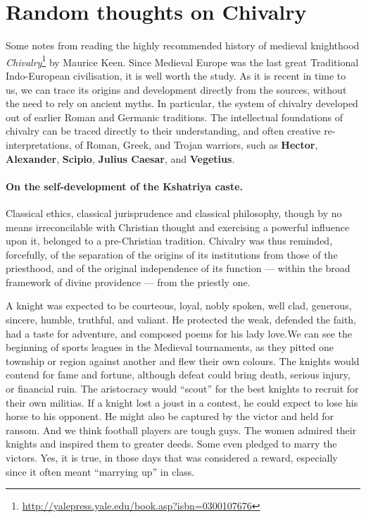 \section{Random thoughts on Chivalry}

Some notes from reading the highly recommended history of medieval knighthood \textit{Chivalry}\footnote{\url{http://yalepress.yale.edu/book.asp?isbn=0300107676}} by Maurice Keen. Since Medieval Europe was the last great Traditional Indo-European civilisation, it is well worth the study. As it is recent in time to us, we can trace its origins and development directly from the sources, without the need to rely on ancient myths. In particular, the system of chivalry developed out of earlier Roman and Germanic traditions. The intellectual foundations of chivalry can be traced directly to their understanding, and often creative re-interpretations, of Roman, Greek, and Trojan warriors, such as \textbf{Hector}, \textbf{Alexander}, \textbf{Scipio}, \textbf{Julius Caesar}, and \textbf{Vegetius}.


\paragraph{On the self-development of the Kshatriya caste.}

\begin{quotex}
Classical ethics, classical jurisprudence and classical philosophy, though by no means irreconcilable with Christian thought and exercising a powerful influence upon it, belonged to a pre-Christian tradition. Chivalry was thus reminded, forcefully, of the separation of the origins of its institutions from those of the priesthood, and of the original independence of its function --- within the broad framework of divine providence --- from the priestly one.
\end{quotex}

A knight was expected to be courteous, loyal, nobly spoken, well clad, generous, sincere, humble, truthful, and valiant. He protected the weak, defended the faith, had a taste for adventure, and composed poems for his lady love.We can see the beginning of sports leagues in the Medieval tournaments, as they pitted one township or region against another and flew their own colours. The knights would contend for fame and fortune, although defeat could bring death, serious injury, or financial ruin. The aristocracy would ``scout'' for the best knights to recruit for their own militias. If a knight lost a joust in a contest, he could expect to lose his horse to his opponent. He might also be captured by the victor and held for ransom. And we think football players are tough guys. The women admired their knights and inspired them to greater deeds. Some even pledged to marry the victors. Yes, it is true, in those days that was considered a reward, especially since it often meant ``marrying up'' in class.

